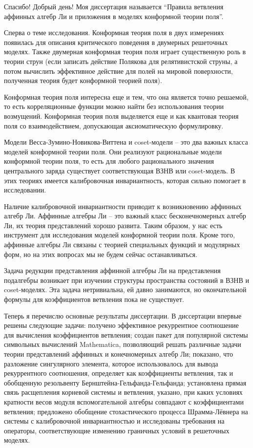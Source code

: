 \documentclass{article}
\theoremstyle{definition} \newtheorem{Def}{Определение}
\begin{document}
Спасибо! Добрый день! 
Моя диссертация называется ``Правила ветвления аффинных алгебр Ли и приложения в моделях конформной теории поля''.

Сперва о теме исследования. Конформная теория поля в двух измерениях появилась для описания критического поведения в двумерных решеточных моделях. Также двумерная конформная теория поля играет существенную роль в теории струн (если записать действие Полякова для релятивистской струны, а потом вычислить эффективное действие для полей на мировой поверхности, полученная теория будет конформной теорией поля). 

Конформная теория поля интересна еще и тем, что она является точно решаемой, то есть корреляционные функции можно найти без использования теории возмущений. Конформная теория поля выделяется еще и как квантовая теория поля со взаимодействием, допускающая аксиоматическую формулировку. 

Модели Весса-Зумино-Новикова-Виттена и coset-модели -- это два важных класса моделей конформной теории поля. Они реализуют рациональные модели конформной теории поля, то есть для любого рационального значения центрального заряда существует соответствующая ВЗНВ или coset-модель. В этих теориях имеется калибровочная инвариантность, которая сильно помогает в исследовании. 

Наличие калибровочной инвариантности приводит к возникновению аффинных алгебр Ли. Аффинные алгебры Ли -- это важный класс бесконечномерных алгебр Ли, их теория представлений хорошо развита. Таким образом, у нас есть инструмент для исследования моделей конформной теории поля. Кроме того, аффинные алгебры Ли связаны с теорией специальных функций и модулярных форм, но на этих вопросах мы не будем сейчас останавливаться. 

Задача редукции представления аффинной алгебры Ли на представления подалгебры возникает при изучении структуры пространства состояний в ВЗНВ и coset-моделях. 
Эта задача нетривиальна, ей давно занимаются, но окончательной формулы для коэффициентов ветвления пока не существует. 

Теперь я перечислю основные результаты диссертации. В диссертации впервые решены следующие задачи: получено эффективное рекуррентное соотношение для вычисления коэффициентов ветвления; создан пакет для популярной системы символьных вычислений Mathematica, позволяющий решать различные задачи теории представлений аффинных и конечномерных алгебр Ли; показано, что разложение сингулярного элемента, которое использовалось для вывода рекуррентного соотношения, определяет как коэффициенты ветвления, так и обобщенную резольвенту Бернштейна-Гельфанда-Гельфанда; установлена прямая связь расщепления корневой системы и ветвления, указано, при каких условиях кратности весов модуля вспомогательной алгебры совпадают с коэффициентами ветвления; предложено обобщение стохастического процесса Шрамма-Лёвнера на системы с калибровочной инвариантностью и исследованы требования на операторы, соответствующие изменению граничных условий в решеточных моделях. 
\end{document}
